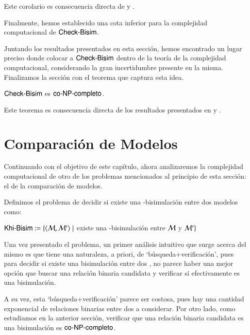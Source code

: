 \begin{demostracion}
    Este corolario es consecuencia directa de  y .
\end{demostracion}

Finalmente, hemos establecido una cota inferior para la complejidad computacional de $\rm\textsf{Check-Bisim}$. 

Juntando los resultados presentados en esta sección, hemos encontrado un lugar preciso donde colocar a $\rm\textsf{Check-Bisim}$ 
dentro de la teoría de la complejidad computacional, considerando la gran incertidumbre presente en la misma. Finalizamos la sección 
con el teorema que captura esta idea.

\begin{teorema}
    $\rm\textsf{Check-Bisim}$ es $\rm\textsf{co-NP-completo}$.
\end{teorema}

\begin{demostracion}
    Este teorema es consecuencia directa de los resultados presentados en  y . 
\end{demostracion}

\section{Comparación de Modelos}

Continuando con el objetivo de este capítulo, ahora analizaremos la complejidad computacional de otro de los problemas mencionados al 
principio de esta sección: el de la comparación de modelos.

\begin{definicion}
    Definimos el problema de decidir si existe una \KHilogic-bisimulación entre dos modelos como:
    \begin{center}
        $\rm\textsf{Khi-Bisim} := \{\langle \mathcal{M},\mathcal{M}' \rangle \mid$ existe una \KHilogic-bisimulación
        entre $\mathcal{M}$ y $\mathcal{M}'\}$
    \end{center}
\end{definicion}

Una vez presentado el problema, un primer análisis intuitivo que surge acerca
del mismo es que tiene una naturaleza, a priori, de `búsqueda+verificación', pues
para decidir si existe una bisimulación entre dos \ultss, no parece haber una mejor
opción que buscar una relación binaria candidata y verificar si efectivamente es una bisimulación. 

A su vez, esta `búsqueda+verificación' parece ser costosa, pues hay una cantidad exponencial de relaciones binarias
entre dos \ultss a considerar. Por otro lado, como estudiamos en la anterior sección, verificar que una relación binaria 
candidata es una bisimulación es $\rm\textsf{co-NP-completo}$. 

